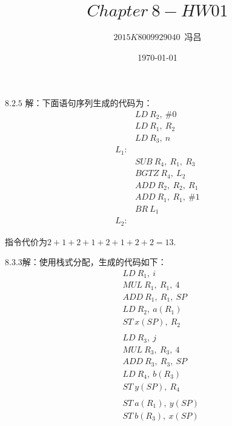 \documentclass[UTF8,noindent]{ctexart}
\title{$Chapter\ 8 -HW01$}
\author{$2015K8009929040$\ 冯吕}
\date{\today}
\begin{document}
\maketitle
{}

$8.2.5$ 解：下面语句序列生成的代码为：
\begin{align*}
&LD\ R_2,\ \#0\\
&LD\ R_1, \ R_2\\
&LD\ R_3, \ n\\
L_1: & \\
&SUB \ R_4, \ R_1,\ R_3\\
&BGTZ \ R_4, \ L_2\\
& ADD\ R_2,\ R_2,\ R_1\\
&ADD\ R_1,\ R_1,\ \#1\\
&BR\ L_1\\
L_2: &
\end{align*}

指令代价为$2+1+2+1+2+1+2+2 =13 $.

$8.3.3$解：使用栈式分配，生成的代码如下：
\begin{align*}
  & LD\ R_1,\ i\\
  & MUL\ R_1,\ R_1,\ 4\\
  & ADD\ R_1,\ R_1,\ SP\\
  & LD\ R_2,\ a(R_1)\\
  & ST\ x(SP),\ R_2\\
  &\\
  &LD\ R_3,\ j\\
  & MUL\ R_3,\ R_3, \ 4\\
  & ADD \ R_3,\ R_3,\ SP\\
  & LD\ R_4,\ b(R_3)\\
  & ST\ y(SP),\ R_4\\
  &\\
  &ST\ a(R_1),\ y(SP)\\
  & ST\ b(R_3),\ x(SP)
\end{align*}
\end{document}
